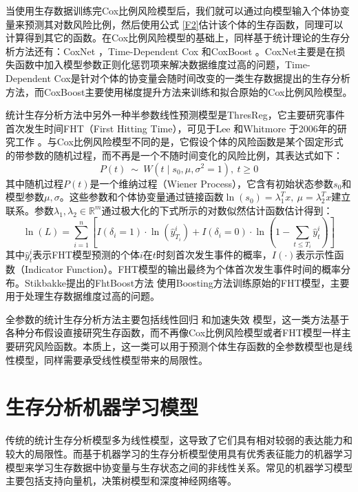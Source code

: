 当使用生存数据训练完Cox比例风险模型后，我们就可以通过向模型输入个体协变量来预测其对数风险比例，然后使用公式 \eqref{F2}估计该个体的生存函数，同理可以计算得到其它的函数。在Cox比例风险模型的基础上，同样基于统计理论的生存分析方法还有：CoxNet ，Time-Dependent Cox 和CoxBoost 。CoxNet主要是在损失函数中加入模型参数正则化惩罚项来解决数据维度过高的问题，Time-Dependent Cox是针对个体的协变量会随时间改变的一类生存数据提出的生存分析方法，而CoxBoost主要使用梯度提升方法来训练和拟合原始的Cox比例风险模型。

统计生存分析方法中另外一种半参数线性预测模型是ThresReg，它主要研究事件首次发生时间FHT（First Hitting Time），可见于Lee 和Whitmore 于2006年的研究工作 。与Cox比例风险模型不同的是，它假设个体的风险函数是某个固定形式的带参数的随机过程，而不再是一个不随时间变化的风险比例，其表达式如下：
\begin{equation}
P(t)\ \sim \ W(t \mid s_0, \mu, \sigma^2=1),\ t\ge 0 \label{F7}
\end{equation}
其中随机过程$P(t)$是一个维纳过程（Wiener Process），它含有初始状态参数$s_0$和模型参数$\mu, \sigma$。这些参数和个体协变量通过链接函数$\ln⁡(s_0 )=\lambda_1^T x,\ \mu = \lambda_2^T x$建立联系。参数$\lambda_1,\lambda_2\in \mathbb{R}^m$通过极大化的下式所示的对数似然估计函数估计得到：
\begin{equation}
\ln(L)=\sum_{i=1}^{n} \left[ I(\delta_i=1)\cdot \ln(\hat{y}_{T_i}^i) + I(\delta_i=0) \cdot \ln(1-\sum_{t\le T_i}\hat{y}_t^i) \right] \label{F8}
\end{equation}
其中$\hat{y}_t^i$表示FHT模型预测的个体$i$在$t$时刻首次发生事件的概率，$I(\cdot)$表示示性函数（Indicator Function）。FHT模型的输出最终为个体首次发生事件时间的概率分布。Stikbakke提出的FhtBoost方法 使用Boosting方法训练原始的FHT模型，主要用于处理生存数据维度过高的问题。

全参数的统计生存分析方法主要包括线性回归 和加速失效 模型，这一类方法基于各种分布假设直接研究生存函数，而不再像Cox比例风险模型或者FHT模型一样主要研究风险函数。本质上，这一类可以用于预测个体生存函数的全参数模型也是线性模型，同样需要承受线性模型带来的局限性。

\section{生存分析机器学习模型}

传统的统计生存分析模型多为线性模型，这导致了它们具有相对较弱的表达能力和较大的局限性。而基于机器学习的生存分析模型使用具有优秀表征能力的机器学习模型来学习生存数据中协变量与生存状态之间的非线性关系。常见的机器学习模型主要包括支持向量机，决策树模型和深度神经网络等。

